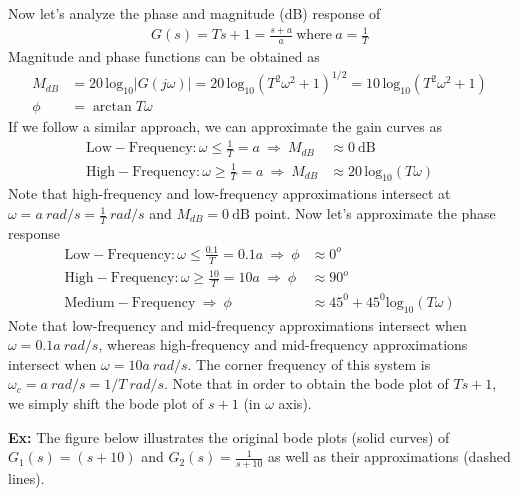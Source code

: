 \documentclass[twoside]{article}
\begin{document}
\vspace{6 pt}

Now let's analyze the phase and magnitude (dB) response of 
%
\begin{align*}
  G(s) = T s + 1 = \frac{s + a}{a} \ \mathrm{where} \ a = \frac{1}{T}
\end{align*}
%
Magnitude and phase functions can be obtained as
\begin{align*}
  M_{dB}  &= 20 \, \mathrm{log}_{10} | G( j \omega) | = 20 \, \mathrm{log}_{10} \left( T^2 \omega^2 + 1 \right)^{1/2} = 10 \, \mathrm{log}_{10} \left( T^2 \omega^2 + 1 \right)
  \\
  \phi &= \arctan T \omega                                    
\end{align*}
%
If we follow a similar approach, we can approximate the gain curves as
%
\begin{align*}
  \mathrm{Low-Frequency}: \omega \leq \frac{1}{T} = a  \ \Rightarrow \ M_{dB}  &\approx 0 \ \mathrm{dB} \\
  \mathrm{High-Frequency}: \omega \geq \frac{1}{T} = a \ \Rightarrow \ M_{dB}  &\approx 20 \, \mathrm{log}_{10} ( T \omega )
\end{align*}
%
Note that high-frequency and low-frequency approximations intersect at
$\omega = a \ rad/s = \frac{1}{T} \ rad/s$ and $M_{dB} = 0 \ \mathrm{dB}$ point. Now 
let's approximate the phase response
%
\begin{align*}
  \mathrm{Low-Frequency}: \omega \leq \frac{0.1}{T} = 0.1 a \ \Rightarrow \ \phi  &\approx 0^o  \\
  \mathrm{High-Frequency}: \omega \geq \frac{10}{T} = 10 a  \ \Rightarrow \ \phi &\approx 90^o \\
  \mathrm{Medium-Frequency} \ \Rightarrow \ \phi & \approx 45^0 + 45^0 \mathrm{log}_{10} ( T \omega)
\end{align*}
%
Note that low-frequency and mid-frequency approximations intersect
when $\omega = 0.1 a \ rad/s$,
whereas high-frequency and mid-frequency approximations intersect when
$\omega = 10 a \ rad/s$.
The corner frequency of this system is $\omega_c = a \ rad/s = 1/T \
rad/s$. Note that in order to obtain the bode plot of $T s + 1$, we
simply shift the bode plot of $s + 1$ (in $\omega$ axis). 

\vspace{6pt}

\textbf{Ex:} The figure below
illustrates the original bode plots (solid curves) of $G_1(s) = (s+10)$ and $G_2(s) = \frac{1}{s+10}$ as well as
their approximations (dashed lines). 
\end{document}
